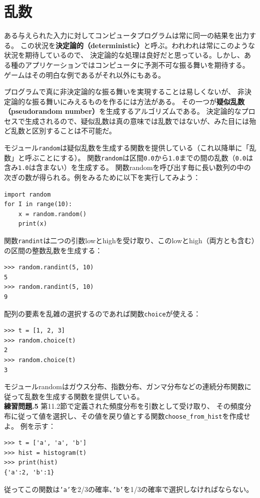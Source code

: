 \documentclass[a4j,12pt,makeidx]{jbook}
\newcommand{\tp}{\thechapter}
\begin{document}
\section{乱数}
ある与えられた入力に対してコンピュータプログラムは常に同一の結果を出力する。
この状況を{\bf 決定論的（deterministic）}と呼ぶ。われわれは常にこのような状況を期待しているので、
決定論的な処理は良好だと思っている。しかし、ある種のアプリケーションではコンピュータに予測不可な振る舞いを期待する。
ゲームはその明白な例であるがそれ以外にもある。 \par
プログラムで真に非決定論的な振る舞いを実現することは易しくないが、
非決定論的な振る舞いにみえるものを作るには方法がある。
その一つが{\bf 疑似乱数（pseudorandom number）}を生成するアルゴリズムである。
決定論的なプロセスで生成されるので、疑似乱数は真の意味では乱数ではないが、みた目には殆ど乱数と区別することは不可能だ。 \par
モジュール{\tt random}は疑似乱数を生成する関数を提供している（これ以降単に「乱数」と呼ぶことにする）。
関数{\tt random}は区間{\tt 0.0}から{\tt 1.0}までの間の乱数（{\tt 0.0}は含み{\tt 1.0}は含まない）を生成する。
関数randomを呼び出す毎に長い数列の中の次ぎの数が得られる。例をみるために以下を実行してみよう：
\begin{verbatim}
import random
for I in range(10):
    x = random.random()
    print(x)
\end{verbatim} 
\indent
関数{\tt randint}は二つの引数lowとhighを受け取り、このlowとhigh（両方とも含む）の区間の整数乱数を生成する：
\begin{verbatim}
>>> random.randint(5, 10)
5
>>> random.randint(5, 10)
9
\end{verbatim} 
配列の要素を乱雑の選択するのであれば関数{\tt choice}が使える：
\begin{verbatim}
>>> t = [1, 2, 3]
>>> random.choice(t)
2
>>> random.choice(t)
3
\end{verbatim}
\indent
モジュールrandomはガウス分布、指数分布、ガンマ分布などの連続分布関数に従って乱数を生成する関数を提供している。\\

\noindent
{\bf 練習問題\tp.5} 第11.2節で定義された頻度分布を引数として受け取り、
その頻度分布に従って値を選択し、その値を戻り値とする関数{\tt choose\_from\_hist}を作成せよ。
例を示す：
\begin{verbatim}
>>> t = ['a', 'a', 'b']
>>> hist = histogram(t)
>>> print(hist)
{'a':2, 'b':1}
\end{verbatim}
従ってこの関数は{\tt 'a'}を2/3の確率、{\tt 'b'}を1/3の確率で選択しなければならない。
%
\end{document}
